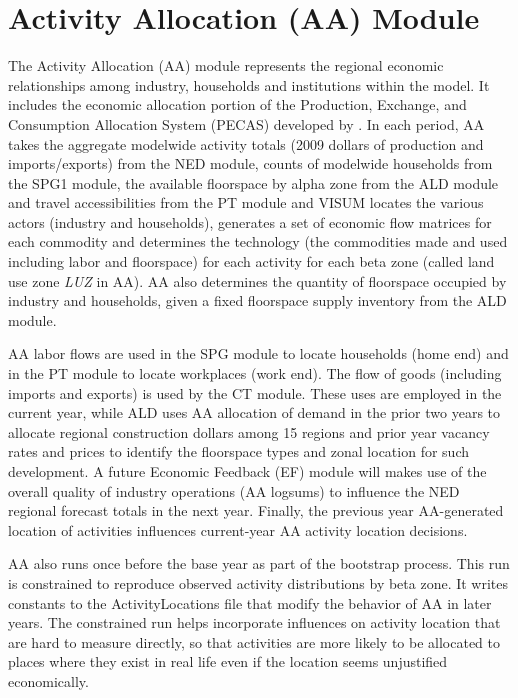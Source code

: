 \chapter{Activity Allocation (AA) Module}\label{sec:aa-module-chapter}
The Activity Allocation (AA) module represents the regional economic relationships among industry, households and institutions within the model. It includes the economic allocation portion of the Production, Exchange, and Consumption Allocation System (PECAS) developed by \cite{hunt05}. In each period, AA takes the aggregate modelwide activity totals (2009 dollars of production and imports/exports) from the NED module, counts of modelwide households from the SPG1 module, the available floorspace by alpha zone from the ALD module and travel accessibilities from the PT module and VISUM locates the various actors (industry and households), generates a set of economic flow matrices for each commodity and determines the technology (the commodities made and used including labor and floorspace) for each activity for each beta zone (called land use zone \textit{LUZ} in AA). AA also determines the quantity of floorspace occupied by industry and households, given a fixed floorspace supply inventory from the ALD module. 

AA labor flows are used in the SPG module to locate households (home end) and in the PT module to locate workplaces (work end). The flow of goods (including imports and exports) is used by the CT module. These uses are employed in the current year, while ALD uses AA allocation of demand in the prior two years to allocate regional construction dollars among 15 regions and prior year vacancy rates and prices to identify the floorspace types and zonal location for such development. A future Economic Feedback (EF) module will makes use of the overall quality of industry operations (AA logsums) to influence the NED regional forecast totals in the next year. Finally, the previous year AA-generated location of activities influences current-year AA activity location decisions.

AA also runs once before the base year as part of the bootstrap process. This run is constrained to reproduce observed activity distributions by beta zone. It writes constants to the ActivityLocations file that modify the behavior of AA in later years. The constrained run helps incorporate influences on activity location that are hard to measure directly, so that activities are more likely to be allocated to places where they exist in real life even if the location seems unjustified economically.

